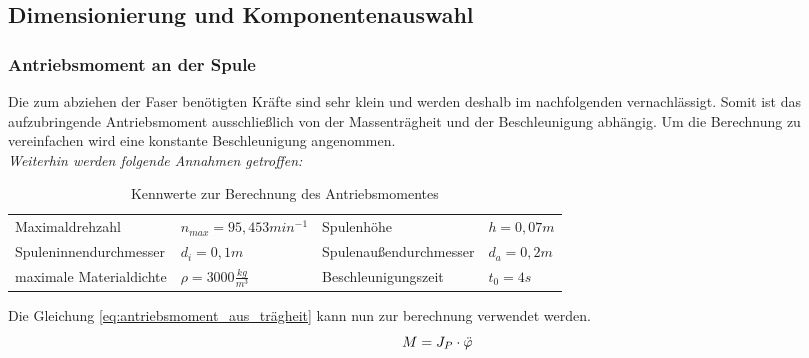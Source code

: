 \subsection{Dimensionierung und Komponentenauswahl}


\subsubsection{Antriebsmoment an der Spule}
Die zum abziehen der Faser benötigten Kräfte sind sehr klein und werden deshalb im nachfolgenden vernachlässigt. Somit ist das aufzubringende Antriebsmoment ausschließlich von der Massenträgheit und der Beschleunigung abhängig. Um die Berechnung zu vereinfachen wird eine konstante Beschleunigung angenommen. \\
\textit{Weiterhin werden folgende Annahmen getroffen:}
\begin{center}
    \begin{table}[!h]
        \begin{tabular}{ll|ll}
             Maximaldrehzahl & $n_{max}=95,453min^{-1}$ &
             Spulenhöhe & $h=0,07m$ \\
             Spuleninnendurchmesser & $d_i = 0,1m$ &
             Spulenaußendurchmesser & $d_a = 0,2m$\\
             maximale Materialdichte & $\rho = 3000 \frac{kg}{m^3}$ &
             Beschleunigungszeit & $t_0 = 4s$   
        \end{tabular}
    \caption{Kennwerte zur Berechnung des Antriebsmomentes}
    \label{tab:geg_antriebsmoment}
    \end{table}
\end{center}
Die Gleichung \ref{eq:antriebsmoment_aus_trägheit} kann nun zur berechnung verwendet werden. 
\begin{equation}\label{eq:antriebsmoment_aus_trägheit}
     M =  J_P \cdot \Ddot{\varphi}
\end{equation}

